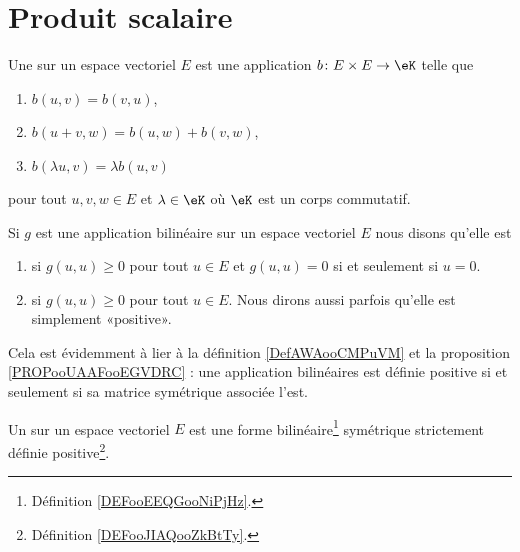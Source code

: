 \section{Produit scalaire}

\begin{definition}      \label{DEFooEEQGooNiPjHz}
    Une  sur un espace vectoriel \( E\) est une application \( b\colon E\times E\to \eK\) telle que
    \begin{enumerate}
        \item
            \( b(u,v)=b(v,u)\),
        \item
            \( b(u+v,w)=b(u,w)+b(v,w)\),
        \item
            \( b(\lambda u,v)=\lambda b(u,v)\)
    \end{enumerate}
    pour tout \( u,v,w\in E\) et \( \lambda\in \eK\) où \( \eK\) est un corps commutatif.
\end{definition}

\begin{definition}      \label{DEFooJIAQooZkBtTy}
    Si $g$ est une application bilinéaire sur un espace vectoriel \( E\) nous disons qu'elle est
    \begin{enumerate}
        \item
             si $g(u,u)\geq 0$ pour tout $u\in E$ et $g(u,u)=0$ si et seulement si $u=0$.
        \item
             si $g(u,u)\geq 0$ pour tout $u\in E$. Nous dirons aussi parfois qu'elle est simplement «positive».
        \end{enumerate}
\end{definition}
Cela est évidemment à lier à la définition \ref{DefAWAooCMPuVM} et la proposition \ref{PROPooUAAFooEGVDRC} : une application bilinéaires est définie positive si et seulement si sa matrice symétrique associée l'est.

\begin{definition}\label{DefVJIeTFj}
    Un  sur un espace vectoriel \( E\) est une forme bilinéaire\footnote{Définition \ref{DEFooEEQGooNiPjHz}.} symétrique strictement définie positive\footnote{Définition \ref{DEFooJIAQooZkBtTy}.}.
\end{definition}

